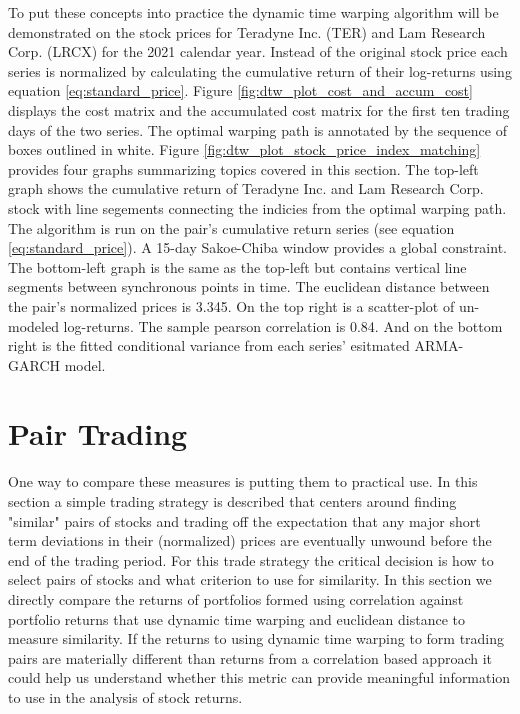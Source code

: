 \documentclass[12pt]{article}
\begin{document}
To put these concepts into practice the dynamic time warping algorithm will be demonstrated on the stock prices for Teradyne Inc. (TER) and Lam Research Corp. (LRCX) for the 2021 calendar year. Instead of the original stock price each series is normalized by calculating the cumulative return of their log-returns using equation \ref{eq:standard_price}. Figure \ref{fig:dtw_plot_cost_and_accum_cost} displays the cost matrix and the accumulated cost matrix for the first ten trading days of the two series. The optimal warping path is annotated by the sequence of boxes outlined in white. Figure \ref{fig:dtw_plot_stock_price_index_matching} provides four graphs summarizing topics covered in this section. The top-left graph shows the cumulative return of Teradyne Inc. and Lam Research Corp. stock with line segements connecting the indicies from the optimal warping path. The algorithm is run on the pair's cumulative return series (see equation \ref{eq:standard_price}). A 15-day Sakoe-Chiba window provides a global constraint. The bottom-left graph is the same as the top-left but contains vertical line segments between synchronous points in time. The euclidean distance between the pair's normalized prices is 3.345. On the top right is a scatter-plot of un-modeled log-returns. The sample pearson correlation is 0.84. And on the bottom right is the fitted conditional variance from each series' esitmated ARMA-GARCH model.


\section{Pair Trading} \label{sec:PairTrading}


One way to compare these measures is putting them to practical use. In this section a simple trading strategy is described that centers around finding "similar" pairs of stocks and trading off the expectation that any major short term deviations in their (normalized) prices are eventually unwound before the end of the trading period. For this trade strategy the critical decision is how to select pairs of stocks and what criterion to use for similarity. In this section we directly compare the returns of portfolios formed using correlation against portfolio returns that use dynamic time warping and euclidean distance to measure similarity. If the returns to using dynamic time warping to form trading pairs are materially different than returns from a correlation based approach it could help us understand whether this metric can provide meaningful information to use in the analysis of stock returns.
\end{document}
